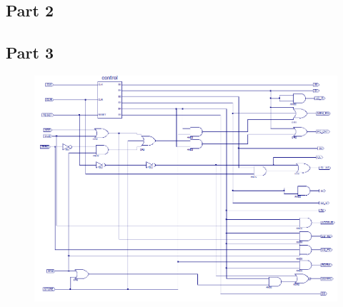 \documentclass[12pt]{article}
\begin{document}
	\subsection{Part 2}
		
	\subsection{Part 3}
		
		\begin{figure}[h]
			\includegraphics[scale=.6]{controller_sch.png}
		\end{figure}
		
\end{document}
